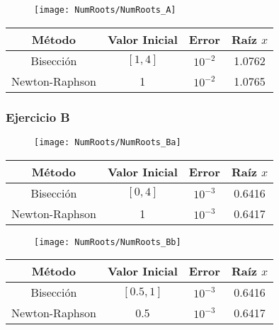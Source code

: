 \begin{figure}[H]
    \texttt{[image: NumRoots/NumRoots\_A]}
    \centering
\end{figure}

\begin{table}[H]
	\begin{center}
		\begin{tabular}{ |c|c|c|c| }
			\hline
			Método & Valor Inicial & Error & Raíz \(x\) \\
			\hline
			\hline
			Bisección 		& \([1,4]\) &	\(10^{-2}\) 	& 1.0762 	\\
			\hline
			Newton-Raphson 	& 	1 		& 	\(10^{-2}\)  	& 1.0765	\\
			\hline
		\end{tabular}
	\end{center}
\end{table}

\subsubsection{Ejercicio B}

\begin{figure}[H]
    \texttt{[image: NumRoots/NumRoots\_Ba]}
    \centering
\end{figure}

\begin{table}[H]
	\begin{center}
		\begin{tabular}{ |c|c|c|c| }
			\hline
			Método & Valor Inicial & Error & Raíz \(x\) \\
			\hline
			\hline
			Bisección 		& \([0,4]\) &	\(10^{-3}\) 	& 0.6416 	\\
			\hline
			Newton-Raphson 	& 	1 		& 	\(10^{-3}\)  	& 0.6417	\\
			\hline
		\end{tabular}
	\end{center}
\end{table}

\begin{figure}[H]
    \texttt{[image: NumRoots/NumRoots\_Bb]}
    \centering
\end{figure}

\begin{table}[H]
	\begin{center}
		\begin{tabular}{ |c|c|c|c| }
			\hline
			Método & Valor Inicial & Error & Raíz \(x\) \\
			\hline
			\hline
			Bisección 		& \([0.5,1]\) &	\(10^{-3}\) 	& 0.6416 	\\
			\hline
			Newton-Raphson 	&	0.5		  & \(10^{-3}\)  	& 0.6417	\\
			\hline
		\end{tabular}
	\end{center}
\end{table}

